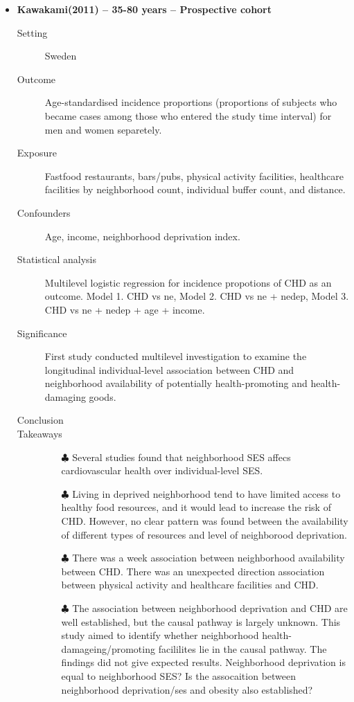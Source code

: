 \documentclass{article}
\begin{document}
\begin{itemize}
\item{\bf Kawakami(2011) -- 35-80 years  -- Prospective cohort} 
		\begin{description}
			\item[Setting] Sweden
			\item[Outcome] Age-standardised incidence proportions (proportions of subjects who became cases among those who entered the study time interval) for men and women separetely. 
			\item[Exposure] Fastfood restaurants, bars/pubs, physical activity facilities, healthcare facilities by neighborhood count, individual buffer count, and distance. 
			\item[Confounders] Age, income, neighborhood deprivation index. 
			\item[Statistical analysis] Multilevel logistic regression for incidence propotions of CHD as an outcome. Model 1. CHD vs ne, Model 2. CHD vs ne + nedep, Model 3. CHD vs ne + nedep + age + income.  
			\item[Significance] First study conducted multilevel investigation to examine the longitudinal individual-level association between CHD and neighborhood availability of potentially health-promoting and health-damaging goods. 
			\item[Conclusion] 
			\item[Takeaways] \mbox{}\par
				\begin{itemize}
					\item[$\clubsuit$] Several studies found that neighborhood SES affecs cardiovascular health over individual-level SES.
					\item[$\clubsuit$] Living in deprived neighborhood tend to have limited access to healthy food resources, and it would lead to increase the risk of CHD. However, no clear pattern was found between the availability of different types of resources and level of neighborood deprivation. 
					\item[$\clubsuit$] There was a week association between neighborhood availability between CHD. There was an unexpected direction association between physical activity and healthcare facilities and CHD. 
					\item[$\clubsuit$] The association between neighborhood deprivation and CHD are well established, but the causal pathway is largely unknown. This study aimed to identify whether neighborhood health-damageing/promoting facililites lie in the causal pathway. The findings did not give expected results. Neighborhood deprivation is equal to neighborhood SES? Is the assocaition between neighborhood deprivation/ses and obesity also established? 
				\end{itemize} 
		\end{description}


\end{itemize}
\end{document}
